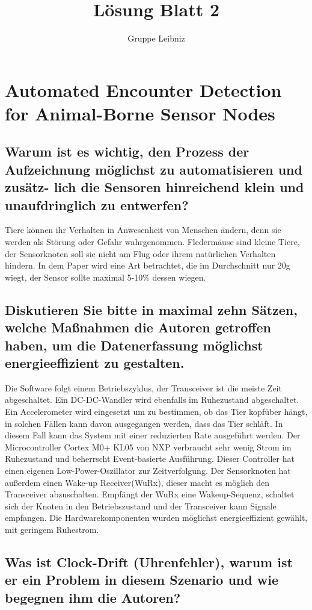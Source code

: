 \documentclass[11pt]{scrartcl}
\title{Lösung Blatt 2}
\author{Gruppe Leibniz}
\begin{document}
\maketitle

\section{Automated Encounter Detection for Animal-Borne Sensor Nodes}
\subsection{Warum ist es wichtig, den Prozess der Aufzeichnung möglichst zu automatisieren und zusätz-
lich die Sensoren hinreichend klein und unaufdringlich zu entwerfen?}
Tiere können ihr Verhalten in Anwesenheit von Menschen ändern, denn sie werden als Störung oder Gefahr wahrgenommen.
Fledermäuse sind kleine Tiere, der Sensorknoten soll sie nicht am Flug oder ihrem natürlichen Verhalten hindern. In dem Paper wird eine Art betrachtet, die im Durchschnitt nur 20g wiegt, der Sensor sollte maximal 5-10\% dessen wiegen.
\subsection{Diskutieren Sie bitte in maximal zehn Sätzen, welche Maßnahmen die Autoren getroffen haben,
um die Datenerfassung möglichst energieeffizient zu gestalten.}
Die Software folgt einem Betriebszyklus, der Transceiver ist die meiste Zeit abgeschaltet. Ein DC-DC-Wandler wird ebenfalls im Ruhezustand abgeschaltet. Ein Accelerometer wird eingesetzt um zu bestimmen, ob das Tier kopfüber hängt, in solchen Fällen kann davon ausgegangen werden, dass das Tier schläft. In diesem Fall kann das System mit einer reduzierten Rate ausgeführt werden. Der Microcontroller Cortex M0+ KL05 von NXP verbraucht sehr wenig Strom im Ruhezustand und beherrscht Event-basierte Ausführung. Dieser Controller hat einen eigenen Low-Power-Oszillator zur Zeitverfolgung.
Der Sensorknoten hat außerdem einen Wake-up Receiver(WuRx), dieser macht es möglich den Transceiver abzuschalten. Empfängt der WuRx eine Wakeup-Sequenz, schaltet sich der Knoten in den Betriebszustand und der Transceiver kann Signale empfangen.
Die Hardwarekomponenten wurden möglichst energieeffizient gewählt, mit geringem Ruhestrom.

\subsection{Was ist Clock-Drift (Uhrenfehler), warum ist er ein Problem in diesem Szenario und wie begegnen ihm die Autoren?}
\end{document}
